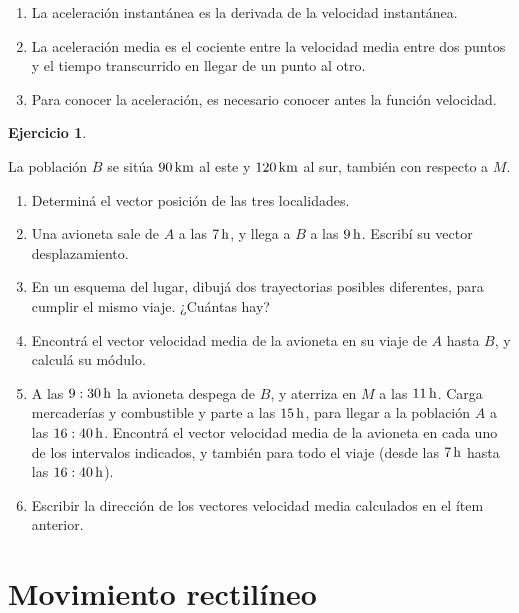 \documentclass[a4paper,12pt,twoside]{book}
\newtheorem{ejercicio}{{Ejercicio}}[chapter]
\begin{document}
\begin{mdframed}[style=ejercicio-conceptual]
\begin{enumerate}
\begin{enumerate}
            \item La aceleración instantánea es la derivada de la velocidad instantánea.

            \item La aceleración media es el cociente entre la velocidad media entre dos puntos y el tiempo transcurrido en llegar de un punto al otro.

            \item Para conocer la aceleración, es necesario conocer antes la función velocidad.
        \end{enumerate}
    \end{enumerate}
\end{mdframed}

\begin{mdframed}[style=ejercicio-conceptual]
    \begin{ejercicio}
    \end{ejercicio}
    La población $B$ se sitúa $90\,\si{\kilo\metre}$ al este y $120\,\si{\kilo\metre}$ al sur, también con respecto a $M$.
    \begin{enumerate}
        \item Determiná el vector posición de las tres localidades.
        \item Una avioneta sale de $A$ a las $7\,\si{\hour}$, y llega a $B$ a las $9\,\si{\hour}$. Escribí su vector desplazamiento.
        \item En un esquema del lugar, dibujá dos trayectorias posibles diferentes, para cumplir el mismo viaje. ¿Cuántas hay?
        \item Encontrá el vector velocidad media de la avioneta en su viaje de $A$ hasta $B$, y calculá su módulo.
        \item A las $9:30\,\si{\hour}$ la avioneta despega de $B$, y aterriza en $M$ a las $11\,\si{\hour}$. Carga mercaderías y combustible y parte a las $15\,\si{\hour}$, para llegar a la población $A$ a las $16:40\,\si{\hour}$. Encontrá el vector velocidad media de la avioneta en cada uno de los intervalos indicados, y también para todo el viaje (desde las $7\,\si{\hour}$ hasta las $16:40\,\si{\hour}$).
        \item Escribir la dirección de los vectores velocidad media calculados en el ítem anterior.
    \end{enumerate}
\end{mdframed}


\section{Movimiento rectilíneo}
\end{document}
